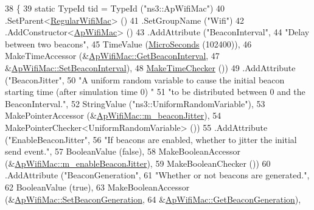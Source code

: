 \begin{DoxyCode}
38 \{
39   \textcolor{keyword}{static} TypeId tid = TypeId (\textcolor{stringliteral}{"ns3::ApWifiMac"})
40     .SetParent<\hyperlink{classns3_1_1RegularWifiMac_a56bc0e2b8ecde6fc50e6f8921ce64957}{RegularWifiMac}> ()
41     .SetGroupName (\textcolor{stringliteral}{"Wifi"})
42     .AddConstructor<\hyperlink{classns3_1_1ApWifiMac_a6fda79b577eb79eaabceb05a36e27b44}{ApWifiMac}> ()
43     .AddAttribute (\textcolor{stringliteral}{"BeaconInterval"},
44                    \textcolor{stringliteral}{"Delay between two beacons"},
45                    TimeValue (\hyperlink{group__timecivil_ga17465a639c8d1464e76538afdd78a9f0}{MicroSeconds} (102400)),
46                    MakeTimeAccessor (&\hyperlink{classns3_1_1ApWifiMac_adaa4b445c0b2a4afa016dd4df1b4b4eb}{ApWifiMac::GetBeaconInterval},
47                                      &\hyperlink{classns3_1_1ApWifiMac_a164d67e99b6afd7cdf95c1ec5a5b40e4}{ApWifiMac::SetBeaconInterval}),
48                    \hyperlink{group__time_ga7032965bd4afa578691d88c09e4481c1}{MakeTimeChecker} ())
49     .AddAttribute (\textcolor{stringliteral}{"BeaconJitter"},
50                    \textcolor{stringliteral}{"A uniform random variable to cause the initial beacon starting time (after simulation
       time 0) "}
51                    \textcolor{stringliteral}{"to be distributed between 0 and the BeaconInterval."},
52                    StringValue (\textcolor{stringliteral}{"ns3::UniformRandomVariable"}),
53                    MakePointerAccessor (&\hyperlink{classns3_1_1ApWifiMac_a319661e15bf89aedd0e0a3494195d055}{ApWifiMac::m\_beaconJitter}),
54                    MakePointerChecker<UniformRandomVariable> ())
55     .AddAttribute (\textcolor{stringliteral}{"EnableBeaconJitter"},
56                    \textcolor{stringliteral}{"If beacons are enabled, whether to jitter the initial send event."},
57                    BooleanValue (\textcolor{keyword}{false}),
58                    MakeBooleanAccessor (&\hyperlink{classns3_1_1ApWifiMac_a803812db18b44720f24e48140e0f0c1e}{ApWifiMac::m\_enableBeaconJitter}),
59                    MakeBooleanChecker ())
60     .AddAttribute (\textcolor{stringliteral}{"BeaconGeneration"},
61                    \textcolor{stringliteral}{"Whether or not beacons are generated."},
62                    BooleanValue (\textcolor{keyword}{true}),
63                    MakeBooleanAccessor (&\hyperlink{classns3_1_1ApWifiMac_a09ad3b96835cb8fac18783423d3e57a7}{ApWifiMac::SetBeaconGeneration},
64                                         &\hyperlink{classns3_1_1ApWifiMac_af6c5a1906e2bb39a655f92738efb9256}{ApWifiMac::GetBeaconGeneration}),

\end{DoxyCode}
